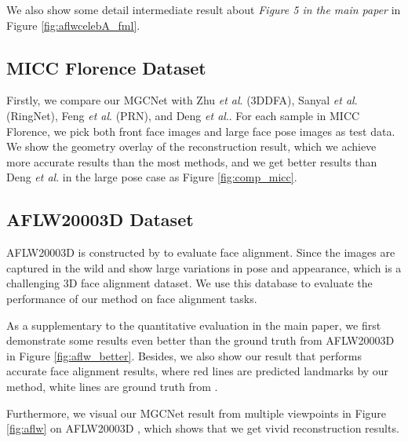 \documentclass[runningheads]{llncs}
\newcommand{\etal}{\textit{et al}.}
\begin{document}
We also show some detail intermediate result about \textit{Figure 5 in the main paper} in Figure \ref{fig:aflwcelebA_fml}.

\subsection{MICC Florence Dataset} \label{compare_micc}
Firstly, we compare our MGCNet with Zhu \etal \cite{dataset_aflw20003D_300WLP_zhu2016face} (3DDFA), Sanyal \etal \cite{unsuper_mul_sanyal2019learning_ring} (RingNet), Feng \etal \cite{super_fit_volu_exp_feng2018joint} (PRN), and Deng \etal \cite{unsuper_mul_ng2019accurate}. For each sample in MICC Florence, we pick both front face images and large face pose images as test data. We show the geometry overlay of the reconstruction result, which we achieve more accurate results than the most methods, and we get better results than Deng \etal \cite{unsuper_mul_ng2019accurate} in the large pose case as Figure \ref{fig:comp_micc}.


\subsection{AFLW20003D Dataset} \label{compare_aflw}
AFLW20003D is constructed by \cite{dataset_aflw20003D_300WLP_zhu2016face} to evaluate face alignment. 
Since the images are captured in the wild and show large variations in pose and appearance, which is a challenging 3D face alignment dataset. We use this database to evaluate the performance of our method on face alignment tasks.

As a supplementary to the quantitative evaluation in the main paper, we first demonstrate some results even better than the ground truth from AFLW20003D \cite{dataset_aflw20003D_300WLP_zhu2016face} in Figure \ref{fig:aflw_better}. Besides, we also show our result that performs accurate face alignment results, where red lines are predicted landmarks by our method, white lines are ground truth from \cite{dataset_aflw20003D_300WLP_zhu2016face}. 

Furthermore, we visual our MGCNet result from multiple viewpoints in Figure \ref{fig:aflw} on AFLW20003D \cite{dataset_aflw20003D_300WLP_zhu2016face}, which shows that we get vivid reconstruction results.
\end{document}
